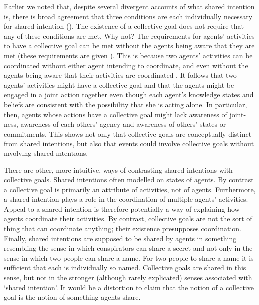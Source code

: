 \documentclass[12pt,a4paper]{extarticle}
\begin{document}
Earlier we noted that, despite several divergent accounts of what shared intention is, there is broad agreement that three conditions are each individually necessary for shared intention ().
The existence of a collective goal does not require that any of these conditions are met.
Why not?
The requirements for agents' activities to have a collective goal can be met without the agents being aware that they are met 
(these requirements are given ).  
This is because two agents' activities can be coordinated without either agent intending to coordinate, and even without the agents being aware that their activities are coordinated \citep{Sebanz:2003kf, schmidt_understanding_2010}.
It follows that two agents' activities might have a collective goal 
and that the agents might be engaged in a joint action together
even though each agent's knowledge states and beliefs are consistent with the possibility that she is acting alone.  
In particular, then, agents whose actions have a collective goal might lack awareness of joint-ness, awareness of each others' agency and awareness of others' states or commitments.
This shows not only that collective goals are conceptually distinct from shared intentions, but also that events  could involve collective goals without involving shared intentions. 

There are other, more intuitive, ways of contrasting shared intentions with collective goals.
Shared intentions often modelled on states of agents.  By contrast a collective goal is primarily an attribute of activities, not of agents.  Furthermore, a shared intention plays a role in the coordination of multiple agents' activities.  Appeal to a shared intention is therefore potentially a way of explaining how agents coordinate their activities.  By contrast, collective goals are not the sort of thing that can coordinate anything; their existence presupposes coordination.  Finally, shared intentions are supposed to be shared by agents in something resembling the sense in which conspirators can share a secret and not only in the sense in which two people can share a name.  
For two people to share a name it is sufficient that each is individually  so named.  
Collective goals are shared in this sense, but not in the stronger (although rarely explicated) senses associated with `shared intention'.
It would be a distortion to claim that the notion of a collective goal is the notion of something agents share.
\end{document}
